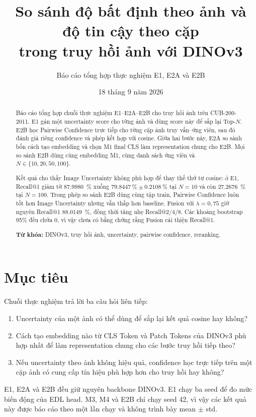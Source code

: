 \documentclass[11pt,a4paper]{article}
\title{\bfseries\LARGE So sánh độ bất định theo ảnh và độ tin cậy theo cặp\\[0.3em]
trong truy hồi ảnh với DINOv3}
\author{Báo cáo tổng hợp thực nghiệm E1, E2A và E2B}
\date{18 tháng 9 năm 2026}
\begin{document}
\maketitle
\thispagestyle{plain}

\begin{abstract}
Báo cáo tổng hợp chuỗi thực nghiệm E1--E2A--E2B cho truy hồi ảnh trên
CUB-200-2011. E1 gán một uncertainty score cho từng ảnh và dùng score này để
sắp lại Top-$N$. E2B học Pairwise Confidence trực tiếp cho từng cặp ảnh truy
vấn--ứng viên, sau đó đánh giá riêng confidence và phép kết hợp với cosine.
Giữa hai bước này, E2A so sánh bốn cách tạo embedding và chọn M1 final CLS làm
representation chung cho E2B. Mọi so sánh E2B dùng cùng embedding M1, cùng
danh sách ứng viên và $N\in\{10,20,50,100\}$.

Kết quả cho thấy Image Uncertainty không phù hợp để thay thế thứ tự cosine:
ở E1, Recall@1 giảm từ \SI{87.9980}{\percent} xuống
$\SI{79.8447}{\percent}\pm\SI{0.2108}{\percent}$ tại $N=10$ và còn
\SI{27.2676}{\percent} tại $N=100$. Trong phép so sánh E2B dùng cùng tập train,
Pairwise Confidence luôn tốt hơn Image Uncertainty nhưng vẫn thấp hơn
baseline. Fusion với $\lambda=0{,}75$ giữ nguyên Recall@1
\SI{88.0149}{\percent}, đồng thời tăng nhẹ Recall@2/4/8. Các khoảng bootstrap
95\% đều chứa 0, vì vậy chưa có bằng chứng rằng Fusion cải thiện Recall@1.

\textbf{Từ khóa:} DINOv3, truy hồi ảnh, uncertainty, pairwise confidence,
reranking.
\end{abstract}

\section{Mục tiêu}
Chuỗi thực nghiệm trả lời ba câu hỏi liên tiếp:
\begin{enumerate}
  \item Uncertainty của một ảnh có thể dùng để sắp lại kết quả cosine hay không?
  \item Cách tạo embedding nào từ CLS Token và Patch Tokens của DINOv3 phù hợp
  nhất để làm representation chung cho các bước truy hồi tiếp theo?
  \item Nếu uncertainty theo ảnh không hiệu quả, confidence học trực tiếp trên
  một cặp ảnh có cung cấp tín hiệu phù hợp hơn cho truy hồi hay không?
\end{enumerate}

E1, E2A và E2B đều giữ nguyên backbone DINOv3. E1 chạy ba seed để đo mức biến
động của EDL head. M3, M4 và E2B chỉ chạy seed 42, vì vậy các kết quả này được
báo cáo theo một lần chạy và không trình bày mean $\pm$ std.
\end{document}
